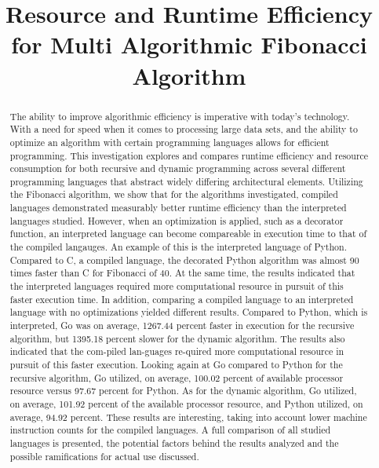 \documentclass{sig-alternate}
\title{Resource and Runtime Efficiency for Multi Algorithmic Fibonacci Algorithm}
\author{}
\begin{document}
\maketitle
\thispagestyle{firstpage}
\pagestyle{plain}




\begin{abstract}

The ability to improve algorithmic efficiency is imperative with today's technology. With a need for speed when it comes to processing large data sets, and the ability to optimize an algorithm with certain programming languages allows for efficient programming. This investigation explores and compares runtime efficiency and resource consumption 
for both recursive and dynamic programming across several different programming languages that abstract widely differing architectural elements. Utilizing the Fibonacci algorithm, we show that for the algorithms investigated, compiled languages demonstrated measurably better runtime efficiency than the interpreted languages studied. However, when an optimization is applied, such as a decorator function, an interpreted language can become compareable in execution time to that of the compiled langauges. An example of this is the interpreted language of Python. Compared to C, a compiled language, the decorated Python algorithm was almost 90 times faster than C for Fibonacci of 40. At the same time, the results indicated that the interpreted languages required more computational resource in pursuit of this faster execution time. In addition, comparing a compiled language to an interpreted language with no optimizations yielded different results. Compared to Python, which is interpreted, Go was on average, 1267.44 percent faster in execution for the recursive algorithm, but 1395.18 percent slower for the dynamic algorithm. The results also indicated that the com-piled lan-guages re-quired more computational resource in pursuit 
of this faster execution. Looking again at Go compared to Python for the recursive algorithm, Go utilized, on average, 100.02 percent of available processor resource versus 97.67 percent for Python. As for the dynamic algorithm, Go utilized, on average, 101.92 percent of the available processor resource, and Python utilized, on average, 94.92 percent. These results are interesting, taking into account lower machine instruction counts for the compiled languages. A full comparison of all studied languages is presented, the potential factors behind the results analyzed and the possible ramifications for actual use discussed.

\end{abstract}
\end{document}
